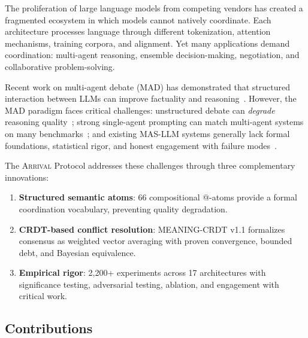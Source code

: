 \documentclass[11pt,a4paper]{article}
\newcommand{\arrival}{\textsc{Arrival}\xspace}
\begin{document}
The proliferation of large language models from competing vendors has
created a fragmented ecosystem in which models cannot natively
coordinate.  Each architecture processes language through different
tokenization, attention mechanisms, training corpora, and alignment.
Yet many applications demand coordination: multi-agent reasoning,
ensemble decision-making, negotiation, and collaborative
problem-solving.

Recent work on multi-agent debate (MAD) has demonstrated that
structured interaction between LLMs can improve factuality and
reasoning~\cite{du2024debate}.  However, the MAD paradigm faces
critical challenges: unstructured debate can \emph{degrade} reasoning
quality~\cite{smit2024mad}; strong single-agent prompting can match
multi-agent systems on many benchmarks~\cite{wang2024rethinking}; and
existing MAS-LLM systems generally lack formal foundations, statistical
rigor, and honest engagement with failure modes~\cite{lamalfa2025limits}.

The \arrival Protocol addresses these challenges through three
complementary innovations:

\begin{enumerate}
  \item \textbf{Structured semantic atoms}: 66 compositional @-atoms
    provide a formal coordination vocabulary, preventing quality
    degradation.
  \item \textbf{CRDT-based conflict resolution}: MEANING-CRDT v1.1
    formalizes consensus as weighted vector averaging with proven
    convergence, bounded debt, and Bayesian equivalence.
  \item \textbf{Empirical rigor}: 2,200+ experiments across 17
    architectures with significance testing, adversarial testing,
    ablation, and engagement with critical work.
\end{enumerate}

\subsection{Contributions}
\end{document}
